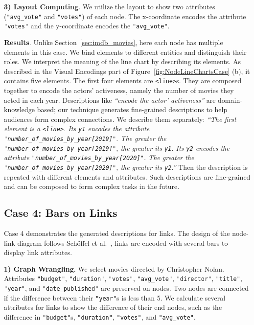 \noindent \textbf{3) Layout Computing}. We utilize the layout to show two attributes (\texttt{"avg\_vote"} and \texttt{"votes"}) of each node. The x-coordinate encodes the attribute \texttt{"votes"} and the y-coordinate encodes the \texttt{"avg\_vote"}.

\textbf{Results}. 
Unlike Section~\ref{sec:imdb_movies}, here each node has multiple elements in this case.
We bind elements to different entities and distinguish their roles.
We interpret the meaning of the line chart by describing its elements.
As described in the Visual Encodings part of Figure~\ref{fig:NodeLineChartsCase} (b), it contains five elements.
The first four elements are \texttt{<line>}s.
They are composed together to encode the actors' activeness, namely the number of movies they acted in each year.
Descriptions like \textit{``encode the actor' activeness''} are domain-knowledge based; our technique generates fine-grained descriptions to help audiences form complex connections.
We describe them separately: 
\textit{``The first element is a \texttt{<line>}. 
Its \texttt{y1} encodes the attribute \texttt{"number\_of\_movies\_by\_year[2019]"}. 
The greater the \texttt{"number\_of\_movies\_by\_year[2019]"}, the greater its \texttt{y1}. 
Its \texttt{y2} encodes the attribute \texttt{"number\_of\_movies\_by\_year[2020]"}.
The greater the \texttt{"number\_of\_movies\_by\_year[2020]"}, the greater its \texttt{y2}.''}
Then the description is repeated with different elements and attributes.
Such descriptions are fine-grained and can be composed to form complex tasks in the future.


\subsection{Case 4: Bars on Links}
Case 4 demonstrates the generated descriptions for links.
The design of the node-link diagram follows Sch{\"{o}}ffel et al.~\cite{DBLP:conf/iv/SchoffelSE16}, links are encoded with several bars to display link attributes.

\noindent \textbf{1) Graph Wrangling}.
We select movies directed by Christopher Nolan.
Attributes \texttt{"budget"}, \texttt{"duration"}, \texttt{"votes"}, \texttt{"avg\_vote"}, \texttt{"director"}, \texttt{"title"}, \texttt{"year"}, and \texttt{"date\_published"} are preserved on nodes.
Two nodes are connected if the difference between their \texttt{"year"}s is less than 5.
We calculate several attributes for links to show the difference of their end nodes, such as the difference in \texttt{"budget"}s, \texttt{"duration"}, \texttt{"votes"}, and \texttt{"avg\_vote"}.

